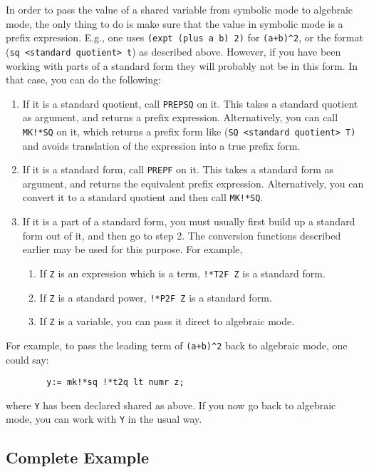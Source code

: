 In order to pass the value of a shared variable from symbolic mode to
algebraic mode, the only thing to do is make sure that the value in
symbolic mode is a prefix expression. E.g., one uses
{\tt (expt (plus a b) 2)} for {\tt (a+b)\verb|^|2}, or the format ({\tt *sq
<standard quotient> t}) as described above.  However, if you have
been working with parts of a standard form they will probably not be in
this form.  In that case, you can do the following:
\begin{enumerate}
\item If it is a standard quotient, call {\tt PREPSQ} on it.  This takes a
standard quotient as argument, and returns a prefix expression.
Alternatively, you can call {\tt MK!*SQ} on it, which returns a prefix
form like ({\tt *SQ <standard quotient> T)} and avoids translation of
the expression into a true prefix form.

\item If it is a standard form, call {\tt PREPF} on it.  This takes a
standard form as argument, and returns the equivalent prefix expression.
Alternatively, you can convert it to a standard quotient and then call
{\tt MK!*SQ}.

\item If it is a part of a standard form, you must usually first build up a
standard form out of it, and then go to step 2. The conversion functions
described earlier may be used for this purpose. For example,
\begin{enumerate}
\item If {\tt Z} is an expression which is a term, {\tt !*T2F Z} is a
standard form.
\item If {\tt Z} is a standard power, {\tt !*P2F Z} is a standard form.
\item If {\tt Z} is a variable, you can pass it direct to algebraic mode.
\end{enumerate}
\end{enumerate}
For example, to pass the leading term of {\tt (a+b)\verb|^|2} back to
algebraic mode, one could say:
\begin{verbatim}
        y:= mk!*sq !*t2q lt numr z;
\end{verbatim}
where {\tt Y} has been declared shared as above.  If you now go back to
algebraic mode, you can work with {\tt Y} in the usual way.


\subsection{Complete Example}

